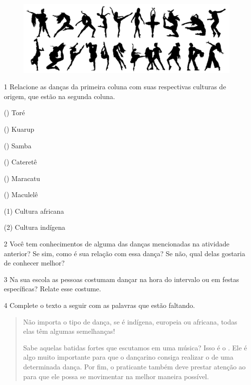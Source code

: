 \begin{figure}[htpb!]
\includegraphics[width=\textwidth]{./imgs/img11.png}
\end{figure}


\num{1} Relacione as danças da primeira coluna com suas respectivas culturas de
  origem, que estão na segunda coluna.

\begin{multicols}{2}
() Toré
    
() Kuarup
    
() Samba

() Cateretê

() Maracatu

() Maculelê

\columnbreak

(1) Cultura africana\medskip

(2) Cultura indígena
\end{multicols}


\num{2} Você tem conhecimentos de alguma das danças mencionadas na atividade anterior? Se sim, como é sua relação com essa dança? Se não, qual delas gostaria de conhecer melhor?


\num{3} Na sua escola as pessoas costumam dançar na hora do intervalo ou em festas específicas? Relate esse costume.


\num{4} Complete o texto a seguir com as palavras que estão faltando.

\begin{quote}
Não importa o tipo de dança, se é indígena, europeia ou africana, todas
elas têm algumas semelhanças!

Sabe aquelas batidas fortes que escutamos em uma música? Isso é o \preencher{}.
Ele é algo muito importante para que o dançarino consiga realizar o \preencher{} de
uma determinada dança. Por fim, o praticante também deve prestar atenção ao
\preencher{} para que ele possa se movimentar na melhor maneira possível.
\end{quote}


